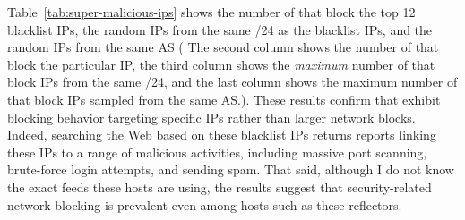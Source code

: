 

Table~\ref{tab:super-malicious-ips} shows the number of {}
that block the top 12 blacklist IPs, the random IPs from the same
/24 as the blacklist IPs, and the random IPs from the same AS ( The second column shows the number of {}
  that block the particular IP, the third column shows the
  \textit{maximum} number of {} that block IPs from the
  same /24, and the last column shows the maximum number of
  {} that block IPs sampled from the same AS.). 
These
results confirm that {} exhibit blocking behavior targeting
specific IPs rather than larger network blocks.  Indeed, searching the
Web based on these blacklist IPs returns reports linking these IPs to
a range of malicious activities, including massive port scanning,
brute-force login attempts, and sending spam. That said, although I do
not know the exact feeds these hosts are using, the results suggest
that security-related network blocking is prevalent even among hosts
such as these reflectors.
